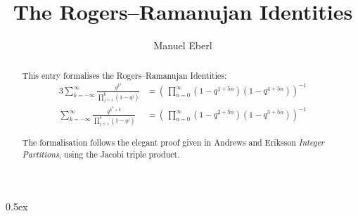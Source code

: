 \documentclass[11pt,a4paper]{article}
\begin{document}
\title{The Rogers--Ramanujan Identities}
\author{Manuel Eberl}
\maketitle

\begin{abstract}
This entry formalises the Rogers--Ramanujan Identities:
\begin{alignat*}{3}
  \sum_{k=-\infty}^\infty \frac{q^{k^2}}{\prod_{j=1}^k (1 - q^j)} &=
  \left(\,\prod_{n=0}^\infty (1 - q^{1+5n}) (1-q^{4+5n})\right)^{-1}\\
  \sum_{k=-\infty}^\infty \frac{q^{k^2+k}}{\prod_{j=1}^k (1 - q^j)} &=
  \left(\,\prod_{n=0}^\infty (1 - q^{2+5n}) (1-q^{3+5n})\right)^{-1}
\end{alignat*}

The formalisation follows the elegant proof given in Andrews and Eriksson 
\emph{Integer Partitions}, using the Jacobi triple product.
\end{abstract}


\newpage
\parindent 0pt\parskip 0.5ex



\raggedright
\nocite{andrews2004}



\end{document}
